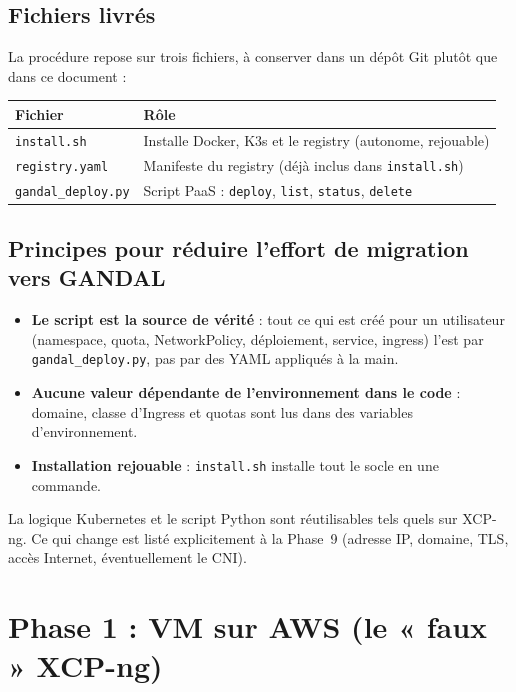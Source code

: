 \documentclass[12pt,a4paper]{article}
\begin{document}
\subsection{Fichiers livrés}
La procédure repose sur trois fichiers, à conserver dans un dépôt Git plutôt que dans ce document :
\begin{center}
\begin{tabular}{ll}
\toprule
\textbf{Fichier} & \textbf{Rôle} \\
\midrule
\texttt{install.sh} & Installe Docker, K3s et le registry (autonome, rejouable) \\
\texttt{registry.yaml} & Manifeste du registry (déjà inclus dans \texttt{install.sh}) \\
\texttt{gandal\_deploy.py} & Script PaaS : \texttt{deploy}, \texttt{list}, \texttt{status}, \texttt{delete} \\
\bottomrule
\end{tabular}
\end{center}

\subsection{Principes pour réduire l'effort de migration vers GANDAL}
\begin{itemize}
    \item \textbf{Le script est la source de vérité} : tout ce qui est créé pour un utilisateur (namespace, quota, NetworkPolicy, déploiement, service, ingress) l'est par \texttt{gandal\_deploy.py}, pas par des YAML appliqués à la main.
    \item \textbf{Aucune valeur dépendante de l'environnement dans le code} : domaine, classe d'Ingress et quotas sont lus dans des variables d'environnement.
    \item \textbf{Installation rejouable} : \texttt{install.sh} installe tout le socle en une commande.
\end{itemize}

\begin{tcolorbox}[colback=green!5!white,colframe=green!75!black,title=Portabilité]
La logique Kubernetes et le script Python sont réutilisables tels quels sur XCP-ng. Ce qui change est listé explicitement à la Phase~9 (adresse IP, domaine, TLS, accès Internet, éventuellement le CNI).
\end{tcolorbox}

\section{Phase 1 : VM sur AWS (le « faux » XCP-ng)}
\end{document}
